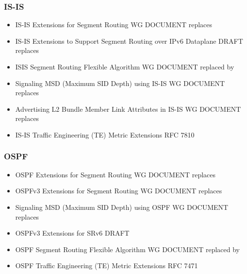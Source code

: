 {\subsubsection{IS-IS}
\begin{itemize}
    \item IS-IS Extensions for Segment Routing WG DOCUMENT \cite{ietf-isis-segment-routing-extensions} replaces \cite{previdi-isis-segment-routing-extensions-05}
    \item IS-IS Extensions to Support Segment Routing over IPv6 Dataplane DRAFT \cite{bashandy-isis-srv6-extensions} replaces \cite{previdi-isis-ipv6-prefix-sid-03}
    \item ISIS Segment Routing Flexible Algorithm WG DOCUMENT \cite{hegdeppsenak-isis-sr-flex-algo-02} replaced by \cite{ietf-lsr-flex-algo-00}
    \item Signaling MSD (Maximum SID Depth) using IS-IS WG DOCUMENT \cite{ietf-isis-segment-routing-msd-12} replaces \cite{tantsura-isis-segment-routing-msd-02}
    \item Advertising L2 Bundle Member Link Attributes in IS-IS WG DOCUMENT \cite{ietf-isis-l2bundles-07} replaces \cite{ginsberg-isis-l2bundles-02}
    \item IS-IS Traffic Engineering (TE) Metric Extensions RFC 7810 \cite{rfc7810}
\end{itemize}    
\subsubsection{OSPF}
\begin{itemize}
    \item OSPF Extensions for Segment Routing WG DOCUMENT \cite{ietf-ospf-segment-routing-extensions} replaces \cite{psenak-ospf-segment-routing-extensions-05}
    \item OSPFv3 Extensions for Segment Routing WG DOCUMENT \cite{ietf-ospf-ospfv3-segment-routing-extensions} replaces \cite{psenak-ospf-segment-routing-ospfv3-extension-02}
    \item Signaling MSD (Maximum SID Depth) using OSPF WG DOCUMENT \cite{ietf-ospf-segment-routing-msd-14} replaces \cite{tantsura-ospf-segment-routing-msd-01}
    \item OSPFv3 Extensions for SRv6 DRAFT \cite{li-ospf-ospfv3-srv6-extensions}
    \item OSPF Segment Routing Flexible Algorithm WG DOCUMENT \cite{ppsenak-ospf-sr-flex-algo-00} replaced by \cite{ietf-lsr-flex-algo-00}
    \item OSPF Traffic Engineering (TE) Metric Extensions RFC 7471 \cite{rfc7471}
\end{itemize}    
}
